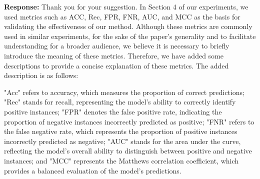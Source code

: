 \documentclass[a4paper,twoside,11pt,dvipsnames]{reviewresponse}
\begin{document}


\textbf{Response:} Thank you for your suggestion. In Section 4 of our experiments, we used metrics such as ACC, Rec, FPR, FNR, AUC, and MCC as the basis for validating the effectiveness of our method. Although these metrics are commonly used in similar experiments, for the sake of the paper's generality and to facilitate understanding for a broader audience, we believe it is necessary to briefly introduce the meaning of these metrics. Therefore, we have added some descriptions to provide a concise explanation of these metrics. The added description is as follows:

"Acc" refers to accuracy, which measures the proportion of correct predictions; "Rec" stands for recall, representing the model's ability to correctly identify positive instances; "FPR" denotes the false positive rate, indicating the proportion of negative instances incorrectly predicted as positive; "FNR" refers to the false negative rate, which represents the proportion of positive instances incorrectly predicted as negative; "AUC" stands for the area under the curve, reflecting the model's overall ability to distinguish between positive and negative instances; and "MCC" represents the Matthews correlation coefficient, which provides a balanced evaluation of the model's predictions.
\end{document}
